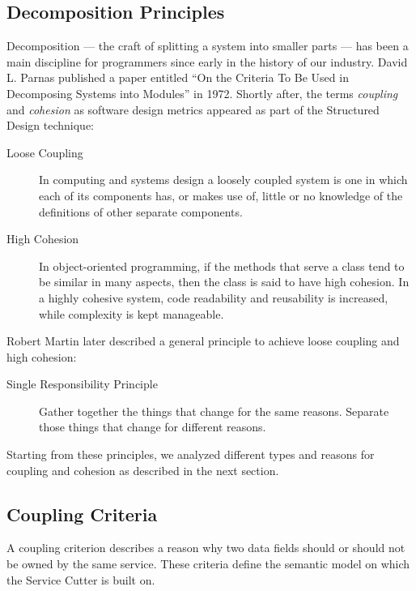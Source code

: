 \subsection{Decomposition Principles}

Decomposition --- the craft of splitting a system into smaller parts --- has been a main discipline for programmers since early in the history of our industry. David L. Parnas published a paper entitled \enquote{On the Criteria To Be Used in Decomposing Systems into Modules} in 1972\cite{parnaDecomposing}. Shortly after, the terms \textit{coupling} 
and \textit{cohesion} as software design metrics appeared as part of the Structured Design technique\cite{structuredDesign}:

\begin{description}
	\item[Loose Coupling] In computing and systems design a loosely coupled system is one in which each of its components has, or makes use of, little or no knowledge of the definitions of other separate components.\cite{looseCoupling}
	\item[High Cohesion] In object-oriented programming, if the methods that serve a class tend to be similar in many aspects, then the class is said to have high cohesion. In a highly cohesive system, code readability and reusability is increased, while complexity is kept manageable.\cite{highCohesion}
\end{description}

Robert Martin later described a general principle to achieve loose coupling and high cohesion:

\begin{description}
	\item[Single Responsibility Principle] Gather together the things that change for the same reasons. Separate those things that change for different reasons.\cite{SRP}
\end{description}

Starting from these principles, we analyzed different types and reasons for coupling and cohesion as described in the next section.

\subsection{Coupling Criteria}
\label{sec:couplingCriteria}

A coupling criterion describes a reason why two data fields should or should not be owned by the same service. These criteria define the semantic model on which the Service Cutter is built on. 

